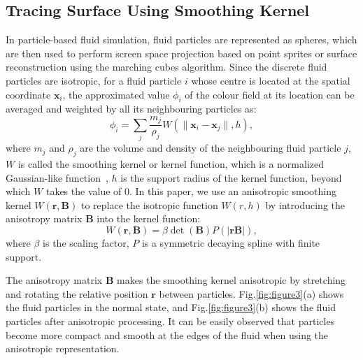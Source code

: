 \documentclass[times,twocolumn,final]{elsarticle}
\begin{document}
\subsection{Tracing Surface Using Smoothing Kernel}
In particle-based fluid simulation, fluid particles are represented as spheres, which are then used to perform screen space projection based on point sprites or surface reconstruction using the marching cubes algorithm. Since the discrete fluid particles are isotropic, for a fluid particle $i$ whose centre is located at the spatial coordinate $\mathbf{x}_i$, the approximated value $\phi_i$ of the colour field at its location can be averaged and weighted by all its neighbouring particles as:
\begin{equation}
\phi_{i}=\sum_{j} \frac{m_{j}}{\rho_{j}} W\left(\|\mathbf{x}_i-\mathbf{x}_j\|, h\right),
\label{con:equa9}
\end{equation}
where $m_j$ and $\rho_j$ are the volume and density of the neighbouring fluid particle $j$, $W$ is called the smoothing kernel or kernel function, which is a normalized Gaussian-like function~\cite{Ihmsen14}, $h$ is the support radius of the kernel function, beyond which $W$ takes the value of 0. In this paper, we use an anisotropic smoothing kernel $W(\mathbf{r},\mathbf{B})$ to replace the isotropic function $W(r,h)$ by introducing the anisotropy matrix $\mathbf{B}$ into the kernel function:
\begin{equation}
W(\mathbf{r},\mathbf{B})=\beta \operatorname{det}(\mathbf{B}) P(|\mathbf{r}\mathbf{B}|),
\label{con:equa10}
\end{equation}
where $\beta$ is the scaling factor, $P$ is a symmetric decaying spline with finite support.

The anisotropy matrix $\mathbf{B}$ makes the smoothing kernel anisotropic by stretching and rotating the relative position $\mathbf{r}$ between particles. Fig.\ref{fig:figure3}(a) shows the fluid particles in the normal state, and Fig.\ref{fig:figure3}(b) shows the fluid particles after anisotropic processing. It can be easily observed that particles become more compact and smooth at the edges of the fluid when using the anisotropic representation.
\end{document}

